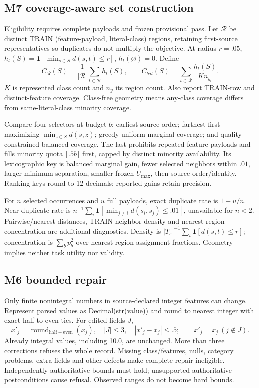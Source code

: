\subsection{M7 coverage-aware set construction}
Eligibility requires complete payloads and frozen provisional pass. Let $\mathcal R$ be distinct TRAIN (feature-payload, literal-class) regions, retaining first-source representatives so duplicates do not multiply the objective. At radius $r=.05$, $h_t(S)=\mathbf1[\min_{s\in S}d(s,t)\le r]$, $h_t(\varnothing)=0$. Define
\begin{equation}
C_{\mathcal R}(S)=\frac1{|\mathcal R|}\sum_{t\in\mathcal R}h_t(S),\qquad
C_{bal}(S)=\sum_{t\in\mathcal R}\frac{h_t(S)}{K n_{y_t}}.
\end{equation}
$K$ is represented class count and $n_y$ its region count. Also report TRAIN-row and distinct-feature coverage. Class-free geometry means any-class coverage differs from same-literal-class minority coverage.

Compare four selectors at budget $b$: earliest source order; farthest-first maximizing $\min_{z\in S}d(s,z)$; greedy uniform marginal coverage; and quality-constrained balanced coverage. The last prohibits repeated feature payloads and fills minority quota $\lfloor .5b\rfloor$ first, capped by distinct minority availability. Its lexicographic key is balanced marginal gain, fewer selected neighbors within $.01$, larger minimum separation, smaller frozen $U_{\max}$, then source order/identity. Ranking keys round to 12 decimals; reported gains retain precision.

For $n$ selected occurrences and $u$ full payloads, exact duplicate rate is $1-u/n$. Near-duplicate rate is $n^{-1}\sum_i\mathbf1[\min_{j\ne i}d(s_i,s_j)\le .01]$, unavailable for $n<2$. Pairwise/nearest distances, TRAIN-neighbor density and nearest-region concentration are additional diagnostics. Density is $|T_s|^{-1}\sum_t\mathbf1[d(s,t)\le r]$; concentration is $\sum_b p_b^2$ over nearest-region assignment fractions. Geometry implies neither task utility nor validity.

\subsection{M6 bounded repair}
Only finite nonintegral numbers in source-declared integer features can change. Represent parsed values as Decimal(str(value)) and round to nearest integer with exact half-to-even ties. For edited fields $J$,
\begin{equation}
x'_j=\operatorname{round}_{\mathrm{half-even}}(x_j),\quad |J|\le3,\quad
|x'_j-x_j|\le .5;\qquad x'_j=x_j\ (j\notin J).
\end{equation}
Already integral values, including 10.0, are unchanged. More than three corrections refuses the whole record. Missing class/features, nulls, category problems, extra fields and other defects make complete repair ineligible. Independently authoritative bounds must hold; unsupported authoritative postconditions cause refusal. Observed ranges do not become hard bounds.

